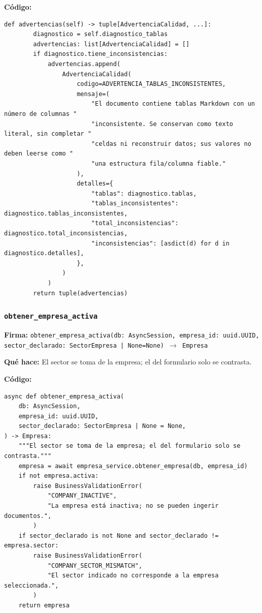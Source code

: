 \documentclass[11pt,a4paper]{article}
\begin{document}
\textbf{Código:}
\begin{lstlisting}
def advertencias(self) -> tuple[AdvertenciaCalidad, ...]:
        diagnostico = self.diagnostico_tablas
        advertencias: list[AdvertenciaCalidad] = []
        if diagnostico.tiene_inconsistencias:
            advertencias.append(
                AdvertenciaCalidad(
                    codigo=ADVERTENCIA_TABLAS_INCONSISTENTES,
                    mensaje=(
                        "El documento contiene tablas Markdown con un número de columnas "
                        "inconsistente. Se conservan como texto literal, sin completar "
                        "celdas ni reconstruir datos; sus valores no deben leerse como "
                        "una estructura fila/columna fiable."
                    ),
                    detalles={
                        "tablas": diagnostico.tablas,
                        "tablas_inconsistentes": diagnostico.tablas_inconsistentes,
                        "total_inconsistencias": diagnostico.total_inconsistencias,
                        "inconsistencias": [asdict(d) for d in diagnostico.detalles],
                    },
                )
            )
        return tuple(advertencias)
\end{lstlisting}

\subsubsection*{\texttt{obtener\_empresa\_activa}}
\textbf{Firma:} \texttt{obtener\_empresa\_activa(db: AsyncSession, empresa\_id: uuid.UUID, sector\_declarado: SectorEmpresa | None=None) $\rightarrow$ Empresa}

\textbf{Qué hace:} El sector se toma de la empresa; el del formulario solo se contrasta.

\textbf{Código:}
\begin{lstlisting}
async def obtener_empresa_activa(
    db: AsyncSession,
    empresa_id: uuid.UUID,
    sector_declarado: SectorEmpresa | None = None,
) -> Empresa:
    """El sector se toma de la empresa; el del formulario solo se contrasta."""
    empresa = await empresa_service.obtener_empresa(db, empresa_id)
    if not empresa.activa:
        raise BusinessValidationError(
            "COMPANY_INACTIVE",
            "La empresa está inactiva; no se pueden ingerir documentos.",
        )
    if sector_declarado is not None and sector_declarado != empresa.sector:
        raise BusinessValidationError(
            "COMPANY_SECTOR_MISMATCH",
            "El sector indicado no corresponde a la empresa seleccionada.",
        )
    return empresa
\end{lstlisting}
\end{document}
